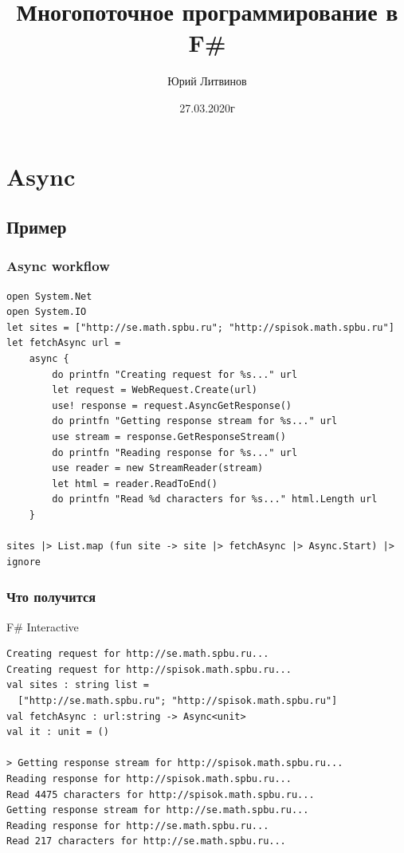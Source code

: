 \documentclass[xetex,mathserif,serif]{beamer}
\title{Многопоточное программирование в F\#}
\author{Юрий Литвинов}
\date{27.03.2020г}
\begin{document}
	
	\frame{\titlepage}

	\section{Async}

	\subsection{Пример}

	\begin{frame}[fragile]
		\frametitle{Async workflow}
		\begin{footnotesize}
			\begin{verbatim}
open System.Net
open System.IO
let sites = ["http://se.math.spbu.ru"; "http://spisok.math.spbu.ru"]
let fetchAsync url =
    async { 
        do printfn "Creating request for %s..." url
        let request = WebRequest.Create(url)
        use! response = request.AsyncGetResponse()
        do printfn "Getting response stream for %s..." url
        use stream = response.GetResponseStream()
        do printfn "Reading response for %s..." url
        use reader = new StreamReader(stream)
        let html = reader.ReadToEnd()
        do printfn "Read %d characters for %s..." html.Length url 
    }

sites |> List.map (fun site -> site |> fetchAsync |> Async.Start) |> ignore
			\end{verbatim}
		\end{footnotesize}
	\end{frame}

	\begin{frame}[fragile]
		\frametitle{Что получится}
		\begin{alertblock}{F\# Interactive}
			\begin{verbatim}
Creating request for http://se.math.spbu.ru...
Creating request for http://spisok.math.spbu.ru...
val sites : string list =
  ["http://se.math.spbu.ru"; "http://spisok.math.spbu.ru"]
val fetchAsync : url:string -> Async<unit>
val it : unit = ()

> Getting response stream for http://spisok.math.spbu.ru...
Reading response for http://spisok.math.spbu.ru...
Read 4475 characters for http://spisok.math.spbu.ru...
Getting response stream for http://se.math.spbu.ru...
Reading response for http://se.math.spbu.ru...
Read 217 characters for http://se.math.spbu.ru...
			\end{verbatim}
		\end{alertblock}
	\end{frame}
\end{document}
